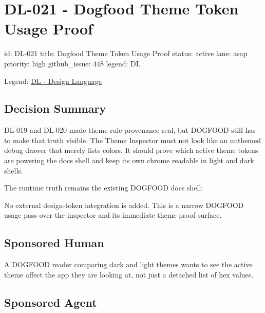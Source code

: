 \chapter{DL-021 - Dogfood Theme Token Usage Proof}\label{record-186}

\smallskip

\begin{RecordMeta}
id: DL-021
title: Dogfood Theme Token Usage Proof
status: active
lane: asap
priority: high
github_issue: 448
legend: DL

\end{RecordMeta}

Legend: \href{https://github.com/flyingrobots/bijou/blob/1853ad902f6bf219326409e7f743a5a1d6517dbc/docs/legends/DL-design-language.md}{DL - Design Language}

\section{Decision Summary}\label{record-186-decision-summary}

DL-019 and DL-020 made theme rule provenance real, but DOGFOOD still has to make that truth visible. The Theme Inspector must not look like an unthemed debug drawer that merely lists colors. It should prove which active theme tokens are powering the docs shell and keep its own chrome readable in light and dark shells.

The runtime truth remains the existing DOGFOOD docs shell:



No external design-token integration is added. This is a narrow DOGFOOD usage pass over the inspector and its immediate theme proof surface.

\section{Sponsored Human}\label{record-186-sponsored-human}

A DOGFOOD reader comparing dark and light themes wants to see the active theme affect the app they are looking at, not just a detached list of hex values.

\section{Sponsored Agent}\label{record-186-sponsored-agent}

